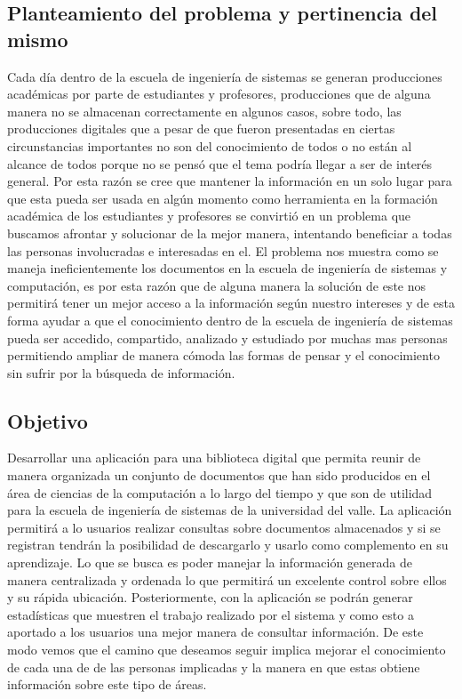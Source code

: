 \documentclass[11pt]{article}
\begin{document}
        \subsection{Planteamiento del problema y pertinencia del mismo}
        Cada día dentro de la escuela de ingeniería de sistemas se generan producciones académicas 			por parte de estudiantes y profesores, producciones que de alguna manera no se almacenan
        correctamente en algunos casos, sobre todo, las producciones digitales que a pesar de que
        fueron presentadas en ciertas circunstancias importantes no son del conocimiento de todos o
        no están al alcance de todos porque no se pensó que el tema podría llegar a ser de interés
        general. Por esta razón se cree que mantener la información en un solo lugar para que esta
        pueda ser usada en algún momento como herramienta en la formación académica de los 
        estudiantes y profesores se convirtió en un problema que buscamos afrontar y solucionar de
        la mejor manera, intentando beneficiar a todas las personas involucradas e interesadas en
        el.
        El problema nos muestra como se maneja ineficientemente los documentos en la escuela de
        ingeniería de sistemas y computación, es por esta razón que de alguna manera la solución de
        este nos permitirá tener un mejor acceso a la información según nuestro intereses y de esta
        forma ayudar a que el conocimiento dentro de la escuela de ingeniería de sistemas pueda ser
        accedido, compartido, analizado y estudiado por muchas mas personas permitiendo ampliar de
        manera cómoda las formas de pensar y el conocimiento sin sufrir por la búsqueda de 
        información.
        
        \subsection{Objetivo}
        Desarrollar una aplicación para una biblioteca digital que permita reunir de manera
        organizada un conjunto de documentos que han sido producidos en el área de ciencias de la
        computación a lo largo del tiempo y que son de utilidad para la escuela de ingeniería de
        sistemas de la universidad del valle. La aplicación permitirá a lo usuarios realizar
        consultas sobre documentos almacenados y si se registran tendrán la posibilidad de
        descargarlo y usarlo como complemento en su aprendizaje. Lo que se busca es poder manejar
        la información generada de manera centralizada y ordenada lo que permitirá un excelente
        control sobre ellos y su rápida ubicación. Posteriormente, con la aplicación se podrán
        generar estadísticas que muestren el trabajo realizado por el sistema y como esto a
        aportado a los usuarios una mejor manera de consultar información.
        De este modo vemos que el camino que deseamos seguir implica mejorar el                      
        conocimiento de cada una de de las personas implicadas y la manera en que estas               
        obtiene información sobre este tipo de áreas.        
        
\end{document}
